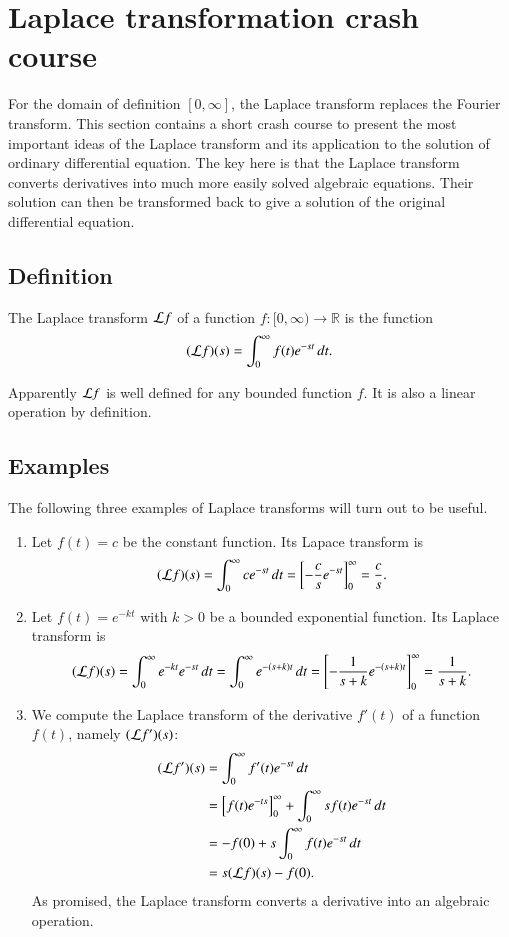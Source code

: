 %
%
%
\section{Laplace transformation crash course}
For the domain of definition $[0,\infty]$, the Laplace transform
replaces the Fourier transform.
This section contains a short crash course to present the most important
ideas of the Laplace transform and its application to the solution
of ordinary differential equation.
The key here is that the Laplace transform converts derivatives into
much more easily solved algebraic equations.
Their solution can then be transformed back to give a solution of the
original differential equation.

\subsection{Definition}
\begin{definition}
The Laplace transform ${\cal L}f$ of a function
$f\colon[0,\infty)\to\mathbb R$ is the function
\[
({\cal L}f)(s)=\int_0^\infty f(t)e^{-st}\,dt.
\]
\end{definition}
Apparently ${\cal L}f$ is well defined for any bounded function $f$.
It is also a linear operation by definition.

\subsection{Examples}
The following three examples of Laplace transforms will turn out to
be useful.
\begin{enumerate}
\item
Let $f(t)=c$ be the constant function.
Its Lapace transform is
\[
({\cal L}f)(s)
=
\int_0^\infty ce^{-st}\,dt
=
\left[
-\frac{c}{s}e^{-st}
\right]_0^\infty=\frac{c}{s}.
\]

\item
Let $f(t)=e^{-kt}$ with $k>0$ be a bounded exponential function.
Its Laplace transform is
\[
({\cal L}f)(s)=\int_0^\infty e^{-kt}e^{-st}\,dt
=\int_0^{\infty}e^{-(s+k)t}\,dt
=
\left[
- \frac1{s+k}e^{-(s+k)t}
\right]_0^\infty
=\frac1{s+k}.
\]

\item
We compute the Laplace transform of the derivative $f'(t)$ of a function
$f(t)$, namely
$({\cal L}f')(s)$:
\begin{align*}
({\cal L}f')(s)
&=
\int_0^\infty f'(t)e^{-st}\,dt
\\
&=
\left[f(t)e^{-ts}\right]_0^\infty
+
\int_0^\infty sf(t)e^{-st}\,dt
\\
&=
-f(0)+s\int_0^\infty f(t)e^{-st}\,dt
\\
&=s({\cal L}f)(s)-f(0).
\end{align*}
As promised, the Laplace transform converts a derivative into an
algebraic operation.
\end{enumerate}

